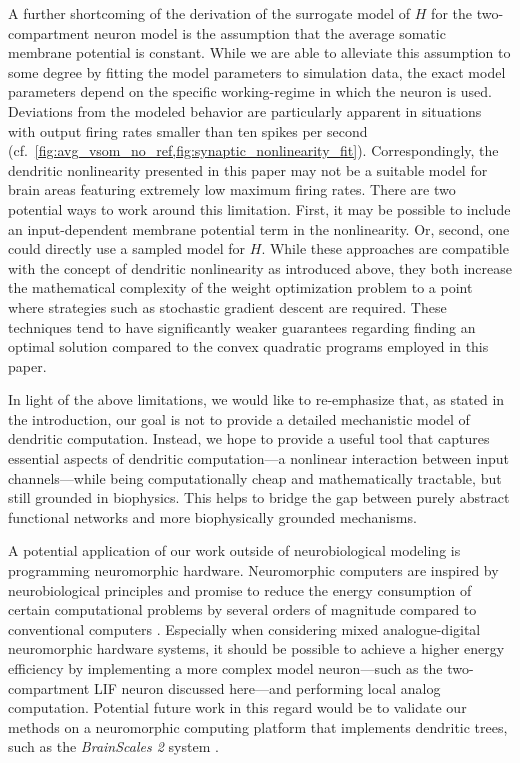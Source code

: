 A further shortcoming of the derivation of the surrogate model of $H$ for the two-compartment neuron model is the assumption that the average somatic membrane potential is constant. While we are able to alleviate this assumption to some degree by fitting the model parameters to simulation data, the exact model parameters depend on the specific working-regime in which the neuron is used. Deviations from the modeled behavior are particularly apparent in situations with output firing rates smaller than ten spikes per second (cf.~\cref{fig:avg_vsom_no_ref,fig:synaptic_nonlinearity_fit}). Correspondingly, the dendritic nonlinearity presented in this paper may not be a suitable model for brain areas featuring extremely low maximum firing rates. There are two potential ways to work around this limitation. First, it may be possible to include an input-dependent membrane potential term in the nonlinearity. Or, second, one could directly use a sampled model for $H$. While these approaches are compatible with the concept of dendritic nonlinearity as introduced above, they both increase the mathematical complexity of the weight optimization problem to a point where strategies such as stochastic gradient descent are required. These techniques tend to have significantly weaker guarantees regarding finding an optimal solution compared to the convex quadratic programs employed in this paper.

In light of the above limitations, we would like to re-emphasize that, as stated in the introduction, our goal is not to provide a detailed mechanistic model of dendritic computation. Instead, we hope to provide a useful tool that captures essential aspects of dendritic computation---a nonlinear interaction between input channels---while being computationally cheap and mathematically tractable, but still grounded in biophysics. This helps to bridge the gap between purely abstract functional networks and more biophysically grounded mechanisms.

A potential application of our work outside of neurobiological modeling is programming neuromorphic hardware. Neuromorphic computers are inspired by neurobiological principles and promise to reduce the energy consumption of certain computational problems by several orders of magnitude compared to conventional computers \citep{boahen2017neuromorph}. Especially when considering mixed analogue-digital neuromorphic hardware systems, it should be possible to achieve a higher energy efficiency by implementing a more complex model neuron---such as the two-compartment LIF neuron discussed here---and performing local analog computation. Potential future work in this regard would be to validate our methods on a neuromorphic computing platform that implements dendritic trees, such as the \emph{BrainScales 2} system \citep{schemmel2017accelerated}.

